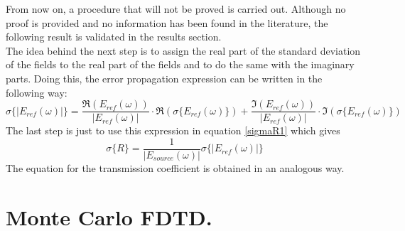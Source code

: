 \documentclass[12pt, oneside]{book}
\begin{document}
\indent From now on, a procedure that will not be proved is carried out. Although no proof is provided and no information has been found in the literature, the following result is validated in the results section. \\
\indent The idea behind the next step is to assign the real part of the standard deviation of the fields to the real part of the fields and to do the same with the imaginary parts. Doing this, the error propagation expression can be written in the following way:
\begin{equation}
\sigma\{|E_{ref}(\omega)|\}=\frac{\Re{(E_{ref}(\omega))}}{|E_{ref}(\omega)|} \cdot \Re{(\sigma\{E_{ref}(\omega)\})} + \frac{\Im{(E_{ref}(\omega))}}{|E_{ref}(\omega)|} \cdot \Im{(\sigma\{E_{ref}(\omega)\})}
\end{equation}
The last step is just to use this expression in equation \ref{sigmaR1} which gives 
\begin{equation}
\sigma\{R\}=\frac{1}{|E_{source}(\omega)|}\sigma\{|E_{ref}(\omega)|\}
\end{equation}
The equation for the transmission coefficient is obtained in an analogous way.

\chapter{Monte Carlo FDTD.}
\end{document}
